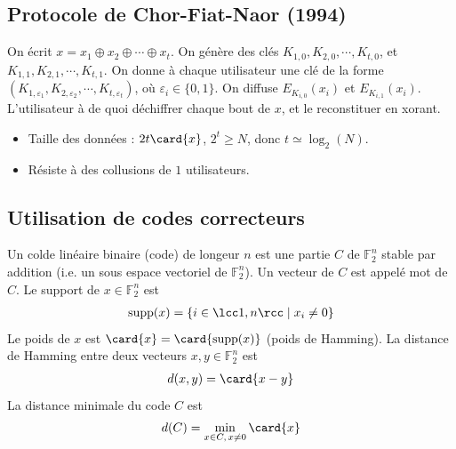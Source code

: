         \subsection{Protocole de Chor-Fiat-Naor (1994)}
            On écrit $x = x_1 \oplus x_2 \oplus \cdots \oplus x_t$. On génère des clés $K_{1, 0}, K_{2, 0}, \cdots, K_{t, 0}$, et $K_{1, 1}, K_{2, 1}, \cdots, K_{t, 1}$. On donne à chaque utilisateur une clé de la forme $(K_{1, \varepsilon_1}, K_{2, \varepsilon_2}, \cdots, K_{t, \varepsilon_t})$, où $\varepsilon_i \in \{0, 1\}$. On diffuse $E_{K_{i, 0}}(x_i)$ et $E_{K_{i, 1}}(x_i)$. L'utilisateur à de quoi déchiffrer chaque bout de $x$, et le reconstituer en xorant.
            \begin{itemize}
                \item Taille des données : $2t\card{x}$, $2^t \geq N$, donc $t \simeq \log_2(N)$.
                \item Résiste à des collusions de $1$ utilisateurs.
            \end{itemize}

        \subsection{Utilisation de codes correcteurs}
            \begin{defi}
                Un colde linéaire binaire (code) de longeur $n$ est une partie $C$ de $\mathbb{F}_2^n$ stable par addition (i.e. un sous espace vectoriel de $\mathbb{F}_2^n$). Un vecteur de $C$ est appelé mot de $C$. Le support de $x \in \mathbb{F}_2^n$ est 
                \begin{align*}
                    \mathrm{supp} (x) = \{i \in \lcc 1, n \rcc \mid x_i \neq 0\}
                \end{align*}
                Le poids de $x$ est $\card{x} = \card{\mathrm{supp} (x)}$ (poids de Hamming). La distance de Hamming entre deux vecteurs $x, y \in \mathbb{F}_2^n$ est 
                \begin{align*}
                    d(x, y) = \card{x - y}
                \end{align*}
                La distance minimale du code $C$ est
                \begin{align*}
                    d(C) = \min_{x \in C,\, x \neq 0} \card{x}
                \end{align*}
            \end{defi}

